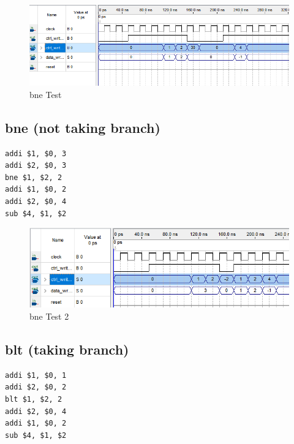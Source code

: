 \documentclass[letterpaper]{article} %
\begin{document}
   \FloatBarrier

  \begin{figure}[!htb]
        \includegraphics[scale=.8]{bneTest.PNG}
        \caption{bne Test}
        \label{fig:2}
    \end{figure}
    
    \FloatBarrier

\pagebreak

    
\subsection{bne (not taking branch)}
\begin{verbatim}
addi $1, $0, 3
addi $2, $0, 3
bne $1, $2, 2
addi $1, $0, 2
addi $2, $0, 4
sub $4, $1, $2 

\end{verbatim}

   \FloatBarrier

  \begin{figure}[!htb]
        \includegraphics[scale=.9]{bneTest2.PNG}
        \caption{bne Test 2}
        \label{fig:2}
    \end{figure}
    
       \FloatBarrier
    \pagebreak
    
\subsection{blt (taking branch)}
\begin{verbatim}
addi $1, $0, 1
addi $2, $0, 2
blt $1, $2, 2
addi $2, $0, 4
addi $1, $0, 2
sub $4, $1, $2

\end{verbatim}
\end{document}
